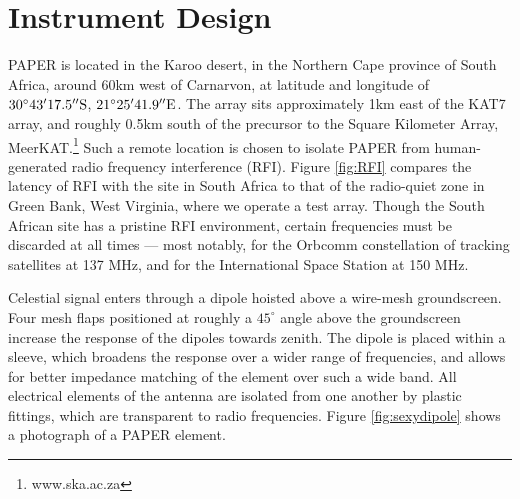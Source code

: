 \section{Instrument Design}\label{sec:design}


PAPER is located in the Karoo desert, in the Northern Cape province of South Africa, around 60km west of Carnarvon, at
latitude and longitude of $30^\circ43'17.5''{\rm S}$, $21^\circ25'41.9''{\rm E}$. The array sits
approximately 1km east of the KAT7 array, and roughly 0.5km south of the precursor to the Square
Kilometer Array, MeerKAT.\footnote{www.ska.ac.za} Such a remote location is chosen to isolate PAPER
from human-generated radio frequency interference
(RFI).
Figure \ref{fig:RFI} compares the latency of RFI with the site in South Africa to that of the
radio-quiet zone in Green Bank, West Virginia, where we operate a test array. Though the South
African site has a pristine RFI environment, certain frequencies must be discarded at all times ---
most notably, for the Orbcomm constellation of tracking satellites at 137 MHz, and for the
International Space Station at 150 MHz. 


Celestial signal enters through a dipole hoisted above a wire-mesh groundscreen. Four mesh flaps
positioned at roughly a $45^\circ$ angle above the groundscreen increase the response of the dipoles
towards zenith. The dipole is placed within a sleeve, which broadens the response over a wider range
of frequencies, and allows for better impedance matching of the element over such a wide band.
All electrical elements of the antenna are isolated from one another by plastic fittings, which are 
transparent to radio frequencies. Figure \ref{fig:sexydipole} shows a photograph of a PAPER element.   


